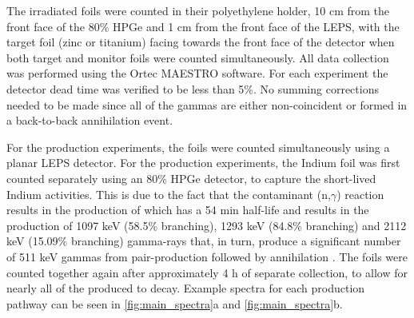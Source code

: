 The irradiated foils were counted in their polyethylene holder, 10 cm from the front face of the 80\% HPGe and 1 cm from the front face of the LEPS, with the target foil (zinc or titanium) facing towards the front face of the detector when both target and monitor foils were counted simultaneously.
All data collection was performed using the Ortec MAESTRO software.
For each experiment the detector dead time was verified to be less than 5\%.
 No summing corrections needed to be made since all of the gammas are either non-coincident or formed in a back-to-back annihilation event.
 

For the   production experiments, the foils were counted simultaneously using a planar LEPS detector.
For the  production experiments, the Indium foil was first counted separately using an 80\% HPGe detector, to capture the short-lived Indium activities.
This is due to the fact that the contaminant (n,$\gamma$) reaction results in the production of  which has a 54 min half-life and results in the production of 1097 keV (58.5\% branching), 1293 keV (84.8\% branching) and 2112 keV (15.09\% branching) gamma-rays that, in turn, produce a significant number of 511 keV gammas from pair-production followed by annihilation \cite{Blachot2010}.
The foils were counted together again after approximately 4 h of separate collection, to allow for nearly all of the produced  to decay.
Example spectra for each production pathway can be seen in  
\autoref{fig:main_spectra}a and \autoref{fig:main_spectra}b.



